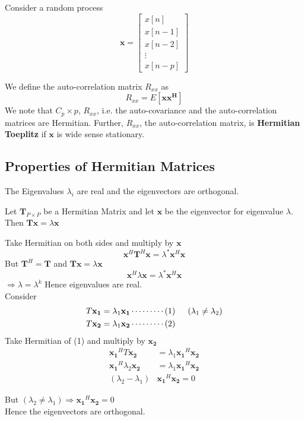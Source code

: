 Consider a random process \[
\mathbf{x}=
  \begin{bmatrix}
    x[n] \\
    x[n-1] \\
    x[n-2] \\
    \vdots \\
    x[n-p]
  \end{bmatrix}
\]

We define the auto-correlation matrix $R_{xx}$ as $$ R_{xx} = E[\mathbf{x}\mathbf{x^H}]$$ 
We note that $C_p\times p$, $R_{xx}$, i.e. the auto-covariance and the auto-correlation matrices are Hermitian. Further, $R_{xx}$, the auto-correlation matrix, is \textbf{Hermitian Toeplitz} if $\mathbf{x}$ is wide sense stationary.

\subsection{Properties of Hermitian Matrices}


The Eigenvalues $\lambda_i$ are real and the eigenvectors are orthogonal.

Let $\mathbf{T}_{P\times P}$ be a Hermitian Matrix and let $\mathbf x$ be the eigenvector for eigenvalue $\lambda$.
\indent Then $\mathbf{T}\mathbf{x} = \lambda \mathbf{x}$

Take Hermitian on both sides and multiply by $\mathbf{x}$
$$\mathbf{x}^H \mathbf{T}^H \mathbf{x} = \lambda^*\mathbf{x}^H\mathbf{x}$$
But $\mathbf{T}^H=\mathbf{T}$ and $\mathbf{T}\mathbf{x} = \lambda \mathbf{x}$
$$\mathbf{x}^H\lambda\mathbf{x} = \lambda^*\mathbf{x}^H\mathbf{x}$$
\indent $\Longrightarrow \lambda = \lambda^k$ \indent Hence eigenvalues are real.\\
Consider 
\begin{align*}
T\mathbf{x_1} &= \lambda_1\mathbf{x_1}\cdots\cdots\cdots(1) \indent (\lambda_1 \neq \lambda_2) \\
T\mathbf{x_2} &= \lambda_1\mathbf{x_2}\cdots\cdots\cdots(2)
\end{align*}
Take Hermitian of (1) and multiply by $\mathbf{x_2}$
\begin{align*}
\mathbf{x_1}^HT\mathbf{x_2} &= \lambda_1\mathbf{x_1}^H\mathbf{x_2}\\
\mathbf{x_1}^H\lambda_2\mathbf{x_2} &= \lambda_1\mathbf{x_1}^H\mathbf{x_2}\\
(\lambda_2 - \lambda_1)&\mathbf{x_1}^H\mathbf{x_2} = 0
\end{align*}

But $(\lambda_2 \neq \lambda_1) \Rightarrow \mathbf{x_1}^H\mathbf{x_2}=0$ \\
Hence the eigenvectors are orthogonal.

